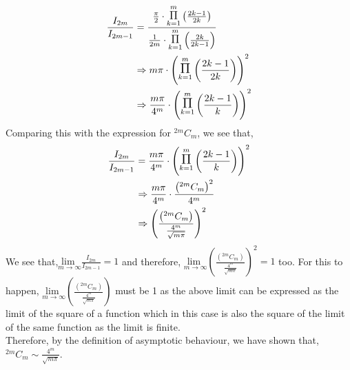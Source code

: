 \documentclass[letterpaper]{exam}
\begin{document}
\begin{questions}
\begin{parts}
\begin{solution}
\begin{align*}
    \frac{I_{2m}}{I_{2m-1}} &= \frac{\frac{\pi}{2}\cdot \overset{m}{\underset{k=1}{\mathlarger{\mathlarger{\Pi}}}} \left(\frac{2k-1}{2k}\right)}{\frac{1}{2m} \cdot \overset{m}{\underset{k=1}{\mathlarger{\mathlarger{\Pi}}}} \left(\frac{2k}{2k-1}\right)}\\
    &\Rightarrow 
    m\pi \cdot \left(\overset{m}{\underset{k=1}{\mathlarger{\mathlarger{\Pi}}}} \left(\frac{2k-1}{2k}\right)\right)^2\\
    &\Rightarrow
    \frac{m \pi}{4^m} \cdot \left(\overset{m}{\underset{k=1}{\mathlarger{\mathlarger{\Pi}}}} \left(\frac{2k-1}{k}\right)\right)^2
\end{align*}
Comparing this with the expression for ${}^{2m} C_m$, we see that,
\begin{align*}
    \frac{I_{2m}}{I_{2m-1}} &= \frac{m \pi}{4^m} \cdot \left(\overset{m}{\underset{k=1}{\mathlarger{\mathlarger{\Pi}}}} \left(\frac{2k-1}{k}\right)\right)^2\\
    &\Rightarrow
    \frac{m \pi}{4^m} \cdot \frac{\left({}^{2m} C_m\right)^2}{4^m}\\
    &\Rightarrow 
    \left(\frac{\left({}^{2m} C_m\right)}{\frac{4^m}{\sqrt{m \pi}}}\right)^2
\end{align*}
We see that,$\underset{m \rightarrow \infty}{\text{lim } } \frac{I_{2m}}{I_{2m-1}} = 1$ and therefore, $\underset{m \rightarrow \infty}{\text{lim } } \left(\frac{\left({}^{2m} C_m\right)}{\frac{4^m}{\sqrt{m \pi}}}\right)^2 = 1$ too. For this to happen, $\underset{m \rightarrow \infty}{\text{lim } } \left(\frac{\left({}^{2m} C_m\right)}{\frac{4^m}{\sqrt{m \pi}}}\right)$ must be 1 as the above limit can be expressed as the limit of the square of a function which in this case is also the square of the limit of the same function as the limit is finite.\\
Therefore, by the definition of asymptotic behaviour, we have shown that,
${}^{2m} C_m \sim \frac{4^m}{\sqrt{m\pi}}$.
\end{solution}

\end{parts}
\end{questions}
\end{document}
